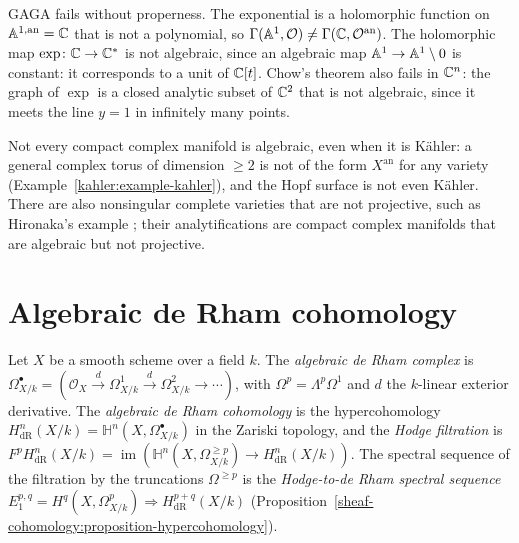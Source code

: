 \begin{counterexample}\label{gaga:counterexample-non-proper}
GAGA fails without properness. The exponential is a holomorphic function on $\mathbb{A}^{1,\mathrm{an}} = \mathbb{C}$ that is not a polynomial, so
$\Gamma(\mathbb{A}^1, \mathcal{O}) \neq \Gamma(\mathbb{C}, \mathcal{O}^{\mathrm{an}})$. The holomorphic map $\exp \colon \mathbb{C} \to \mathbb{C}^*$ is not algebraic, since an algebraic map $\mathbb{A}^1 \to \mathbb{A}^1 \setminus 0$
is constant: it corresponds to a unit of $\mathbb{C}[t]$. Chow's theorem also fails in $\mathbb{C}^n$: the graph of $\exp$ is a closed analytic subset of $\mathbb{C}^2$ that is not algebraic,
since it meets the line $y = 1$ in infinitely many points.
\end{counterexample}

\begin{counterexample}\label{gaga:counterexample-non-algebraic}
Not every compact complex manifold is algebraic, even when it is K\"ahler: a general complex torus of dimension $\geq 2$ is not of the form $X^{\mathrm{an}}$ for any
variety (Example~\ref{kahler:example-kahler}), and the Hopf surface is not even K\"ahler. There are also nonsingular complete varieties that are not projective,
such as Hironaka's example \cite[Appendix B, Example 3.4.1]{hartshorne-ag}; their analytifications are compact complex manifolds that are algebraic but not
projective.
\end{counterexample}

\section{Algebraic de Rham cohomology}\label{gaga:section-de-rham}

\begin{definition}\label{gaga:definition-algebraic-de-rham}
Let $X$ be a smooth scheme over a field $k$. The \emph{algebraic de Rham complex} is $\Omega^\bullet_{X/k} = (\mathcal{O}_X \xrightarrow{d} \Omega^1_{X/k} \xrightarrow{d} \Omega^2_{X/k} \to \cdots)$, with
$\Omega^p = \Lambda^p\Omega^1$ and $d$ the $k$-linear exterior derivative. The \emph{algebraic de Rham cohomology} is the hypercohomology
$H^n_{\mathrm{dR}}(X/k) = \mathbb{H}^n(X, \Omega^\bullet_{X/k})$ in the Zariski topology, and the \emph{Hodge filtration} is
$F^pH^n_{\mathrm{dR}}(X/k) = \operatorname{im}\left(\mathbb{H}^n(X, \Omega^{\geq p}_{X/k}) \to H^n_{\mathrm{dR}}(X/k)\right)$. The spectral sequence of the filtration by the
truncations $\Omega^{\geq p}$ is the \emph{Hodge-to-de Rham spectral sequence} $E_1^{p,q} = H^q(X, \Omega^p_{X/k}) \Rightarrow H^{p+q}_{\mathrm{dR}}(X/k)$
(Proposition~\ref{sheaf-cohomology:proposition-hypercohomology}).
\end{definition}

